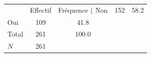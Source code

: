 {
\def\sym#1{\ifmmode^{#1}\else\(^{#1}\)\fi}
\begin{tabular}{l*{1}{cc}}
\toprule
            &    Effectif&Fréquence (%
\midrule
Non         &         152&        58.2\\
Oui         &         109&        41.8\\
Total       &         261&       100.0\\
\midrule
\(N\)       &         261&            \\
\bottomrule
\end{tabular}
}
